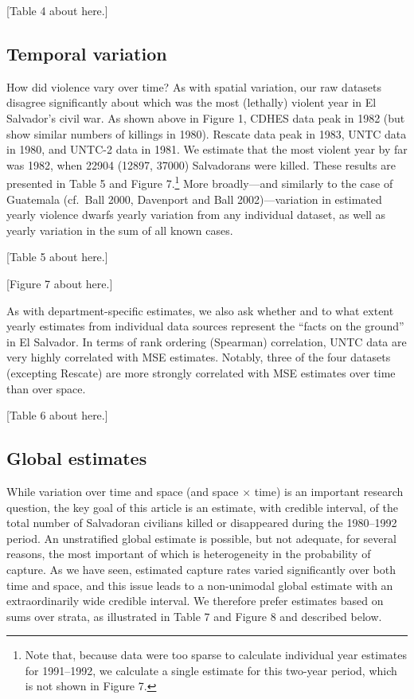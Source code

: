 \documentclass[11pt,]{article}
\let\rmarkdownfootnote\footnote%
\def\footnote{\protect\rmarkdownfootnote}
\begin{document}
{[}Table 4 about here.{]}

\hypertarget{temporal-variation}{%
\subsection{Temporal variation}\label{temporal-variation}}

How did violence vary over time? As with spatial variation, our raw
datasets disagree significantly about which was the most (lethally)
violent year in El Salvador's civil war. As shown above in Figure 1,
CDHES data peak in 1982 (but show similar numbers of killings in 1980).
Rescate data peak in 1983, UNTC data in 1980, and UNTC-2 data in 1981.
We estimate that the most violent year by far was 1982, when 22904
(12897, 37000) Salvadorans were killed. These results are presented in
Table 5 and Figure 7.\footnote{Note that, because data were too sparse
  to calculate individual year estimates for 1991--1992, we calculate a
  single estimate for this two-year period, which is not shown in Figure
  7.} More broadly---and similarly to the case of Guatemala (cf.~Ball
2000, Davenport and Ball 2002)---variation in estimated yearly violence
dwarfs yearly variation from any individual dataset, as well as yearly
variation in the sum of all known cases.

{[}Table 5 about here.{]}

{[}Figure 7 about here.{]}

As with department-specific estimates, we also ask whether and to what
extent yearly estimates from individual data sources represent the
``facts on the ground'' in El Salvador. In terms of rank ordering
(Spearman) correlation, UNTC data are very highly correlated with MSE
estimates. Notably, three of the four datasets (excepting Rescate) are
more strongly correlated with MSE estimates over time than over space.

{[}Table 6 about here.{]}

\hypertarget{global-estimates}{%
\subsection{Global estimates}\label{global-estimates}}

While variation over time and space (and space \(\times\) time) is an
important research question, the key goal of this article is an
estimate, with credible interval, of the total number of Salvadoran
civilians killed or disappeared during the 1980--1992 period. An
unstratified global estimate is possible, but not adequate, for several
reasons, the most important of which is heterogeneity in the probability
of capture. As we have seen, estimated capture rates varied
significantly over both time and space, and this issue leads to a
non-unimodal global estimate with an extraordinarily wide credible
interval. We therefore prefer estimates based on sums over strata, as
illustrated in Table 7 and Figure 8 and described below.
\end{document}
